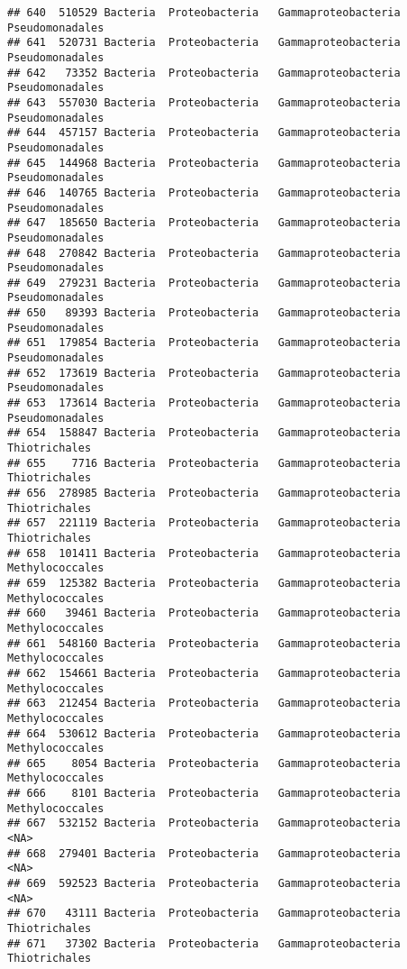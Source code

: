\documentclass[
]{article}
\begin{document}
\begin{verbatim}
## 640  510529 Bacteria  Proteobacteria   Gammaproteobacteria     Pseudomonadales
## 641  520731 Bacteria  Proteobacteria   Gammaproteobacteria     Pseudomonadales
## 642   73352 Bacteria  Proteobacteria   Gammaproteobacteria     Pseudomonadales
## 643  557030 Bacteria  Proteobacteria   Gammaproteobacteria     Pseudomonadales
## 644  457157 Bacteria  Proteobacteria   Gammaproteobacteria     Pseudomonadales
## 645  144968 Bacteria  Proteobacteria   Gammaproteobacteria     Pseudomonadales
## 646  140765 Bacteria  Proteobacteria   Gammaproteobacteria     Pseudomonadales
## 647  185650 Bacteria  Proteobacteria   Gammaproteobacteria     Pseudomonadales
## 648  270842 Bacteria  Proteobacteria   Gammaproteobacteria     Pseudomonadales
## 649  279231 Bacteria  Proteobacteria   Gammaproteobacteria     Pseudomonadales
## 650   89393 Bacteria  Proteobacteria   Gammaproteobacteria     Pseudomonadales
## 651  179854 Bacteria  Proteobacteria   Gammaproteobacteria     Pseudomonadales
## 652  173619 Bacteria  Proteobacteria   Gammaproteobacteria     Pseudomonadales
## 653  173614 Bacteria  Proteobacteria   Gammaproteobacteria     Pseudomonadales
## 654  158847 Bacteria  Proteobacteria   Gammaproteobacteria       Thiotrichales
## 655    7716 Bacteria  Proteobacteria   Gammaproteobacteria       Thiotrichales
## 656  278985 Bacteria  Proteobacteria   Gammaproteobacteria       Thiotrichales
## 657  221119 Bacteria  Proteobacteria   Gammaproteobacteria       Thiotrichales
## 658  101411 Bacteria  Proteobacteria   Gammaproteobacteria     Methylococcales
## 659  125382 Bacteria  Proteobacteria   Gammaproteobacteria     Methylococcales
## 660   39461 Bacteria  Proteobacteria   Gammaproteobacteria     Methylococcales
## 661  548160 Bacteria  Proteobacteria   Gammaproteobacteria     Methylococcales
## 662  154661 Bacteria  Proteobacteria   Gammaproteobacteria     Methylococcales
## 663  212454 Bacteria  Proteobacteria   Gammaproteobacteria     Methylococcales
## 664  530612 Bacteria  Proteobacteria   Gammaproteobacteria     Methylococcales
## 665    8054 Bacteria  Proteobacteria   Gammaproteobacteria     Methylococcales
## 666    8101 Bacteria  Proteobacteria   Gammaproteobacteria     Methylococcales
## 667  532152 Bacteria  Proteobacteria   Gammaproteobacteria                <NA>
## 668  279401 Bacteria  Proteobacteria   Gammaproteobacteria                <NA>
## 669  592523 Bacteria  Proteobacteria   Gammaproteobacteria                <NA>
## 670   43111 Bacteria  Proteobacteria   Gammaproteobacteria       Thiotrichales
## 671   37302 Bacteria  Proteobacteria   Gammaproteobacteria       Thiotrichales

\end{verbatim}
\end{document}
